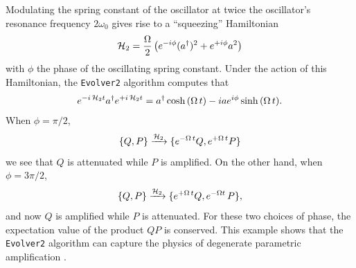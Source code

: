 Modulating the spring constant of the oscillator at twice the oscillator's resonance frequency $2 \omega_0$ gives rise to a ``squeezing'' Hamiltonian
\begin{equation}
{\cal H}_2 = \frac{\Omega}{2} \left( e^{-i \phi} (a^\dagger)^2 + e^{+i \phi} a^2 \right)
\end{equation}
with $\phi$ the phase of the oscillating spring constant.  
Under the action of this Hamiltonian, the \verb+Evolver2+ algorithm computes that
\begin{equation}
e^{-i \, {\cal H}_2  t}  a^{\dagger} e^{+i \, {\cal H}_2  t}
 = a^{\dagger} \cosh{(\Omega \, t)} - i a e^{i \phi} \sinh{(\Omega \, t)}.
\label{eq:sqeeze-a-dagger--resonance}
\end{equation}
When $\phi = \pi/2$, 
\begin{equation}
\{ Q, P \} \xrightarrow{{\cal H}_2}  \{ e^{-\Omega \, t} Q, e^{+\Omega \, t} P \} 
\end{equation}
we see that $Q$ is attenuated while $P$ is amplified.
On the other hand, when $\phi = 3 \pi/2$, 
\begin{equation}
\{ Q, P \} \xrightarrow{{\cal H}_2}  \{ e^{+\Omega \, t} Q, e^{-\Omega t} \, P \},
\end{equation}
and now $Q$ is amplified while $P$ is attenuated. 
For these two choices of phase, the expectation value of the product $Q P$ is conserved.
This example shows that the \verb+Evolver2+ algorithm can capture the physics of degenerate parametric amplification \cite{Mollow1967aug,Mollow1967auga}.

